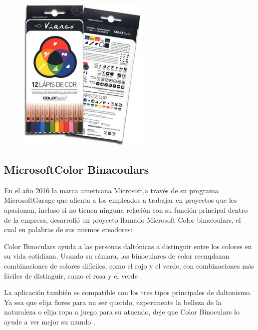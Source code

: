 \documentclass[10pt]{article}
\begin{document}
\begin{figure}[H]
	\begin{center}
\includegraphics[scale = 0.45]{Imagenes/coloradd.jpg}
	\end{center} 
\end{figure}

\subsection{Microsoft\textregistered \space Color Binacoulars }
En el año 2016 la marca americana Microsoft\textregistered,\space a través de su programa Microsoft\textregistered \space Garage que alienta a los empleados a trabajar en proyectos que les apasionan, incluso si no tienen ninguna relación con su función principal dentro de la empresa, desarrolló un proyecto llamado Microsoft Color binacoulars, el cual en palabras de sus mismos creadores:

\setlength{\parskip}{2mm}

Color Binoculars ayuda a las personas daltónicas a distinguir entre los colores en su vida cotidiana. Usando su cámara, los binoculares de color reemplazan combinaciones de colores difíciles, como el rojo y el verde, con combinaciones más fáciles de distinguir, como el rosa y el verde  \cite{IEEEreferencias:Ref18}.

\setlength{\parskip}{2mm}

La aplicación también es compatible con los tres tipos principales de daltonismo. Ya sea que elija flores para un ser querido, experimente la belleza de la naturaleza o elija ropa a juego para su atuendo, deje que Color Binoculars lo ayude a ver mejor su mundo  \cite{IEEEreferencias:Ref18}.

\setlength{\parskip}{2mm}
\end{document}
